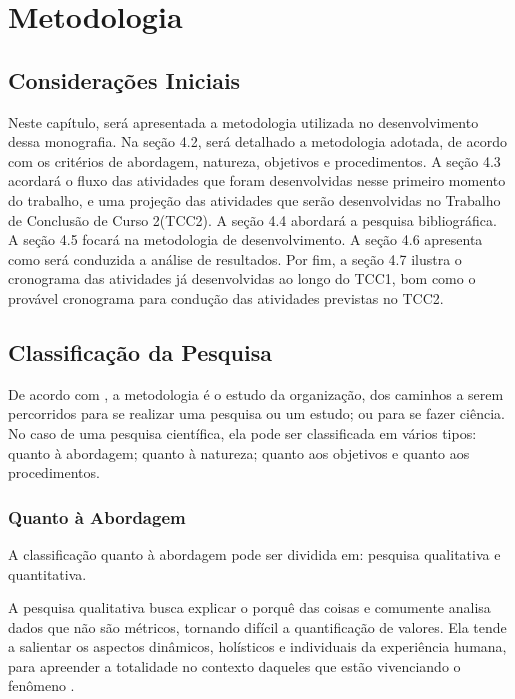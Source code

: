 \chapter[Metodologia]{Metodologia}

\section{Considerações Iniciais}

Neste capítulo, será apresentada a metodologia utilizada no desenvolvimento dessa 
monografia. Na seção 4.2, será detalhado a metodologia adotada, de acordo com os 
critérios de abordagem, natureza, objetivos e procedimentos. A seção 4.3 acordará o fluxo 
das atividades que foram desenvolvidas nesse primeiro momento do trabalho, e uma projeção das atividades 
que serão desenvolvidas no Trabalho de Conclusão de Curso 2(TCC2). A seção 4.4 abordará a pesquisa bibliográfica.
A seção 4.5 focará na metodologia de desenvolvimento. A seção 4.6 apresenta como será conduzida a análise de resultados. 
Por fim, a seção 4.7 ilustra 
o cronograma das atividades já desenvolvidas ao longo do TCC1, bom como o provável cronograma para 
condução das atividades previstas no TCC2.


\section{Classificação da Pesquisa}

De acordo com , a metodologia é o estudo da organização, dos 
caminhos a serem percorridos para se realizar uma pesquisa ou um estudo; ou para se 
fazer ciência. No caso de uma pesquisa científica, ela pode ser classificada em 
vários tipos: quanto à abordagem; quanto à natureza; quanto aos objetivos e quanto aos procedimentos.

\subsection{Quanto à Abordagem}

A classificação quanto à abordagem pode ser dividida em: pesquisa qualitativa e quantitativa. 

A pesquisa qualitativa busca explicar o porquê das coisas e 
comumente analisa dados que não são métricos, tornando difícil 
a quantificação de valores. Ela tende a salientar os
aspectos dinâmicos, holísticos e individuais da experiência humana, para apreender
a totalidade no contexto daqueles que estão vivenciando o fenômeno \cite{gerhardt2009}.

